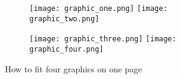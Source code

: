 \documentclass{book}
\begin{document}
	\begin{figure}

		\begin{subfigure}[l]{0.5\textwidth}
		\texttt{[image: graphic\_one.png]}
		\texttt{[image: graphic\_two.png]}
		\end{subfigure}


		
		\begin{subfigure}[r]{0.5\textwidth}
		\texttt{[image: graphic\_three.png]}
		\texttt{[image: graphic\_four.png]}
		\end{subfigure}

		\caption{How to fit four graphics on one page}
		
		\label{figure:multipage}
		
	\end{figure}
\end{document}
